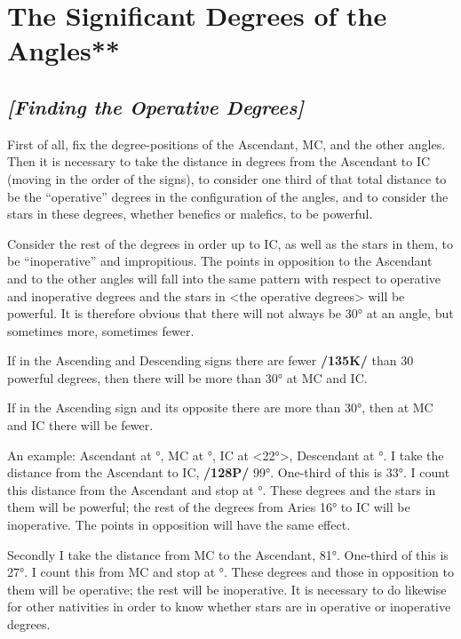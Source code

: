 \section{The Significant Degrees of the Angles**}
\subsection{\textit{[Finding the Operative Degrees]}}
First of all, fix the degree-positions of the Ascendant, MC, and the other angles. Then it is necessary to take the distance in degrees from the Ascendant to IC (moving in the order of the signs), to consider one third of that total distance to be the “operative” degrees in the configuration of the angles, and to consider the stars in these degrees, whether benefics or malefics, to be powerful. 

Consider the rest of the degrees in order up to IC, as well as the stars in them, to be “inoperative” and impropitious. The points in opposition to the Ascendant and to the other angles will fall into the same pattern with respect to operative
and inoperative degrees and the stars in <the operative degrees> will be powerful. It is therefore obvious that there will not always be 30° at an angle, but sometimes more, sometimes fewer. 

If in the Ascending and Descending signs there are fewer \textbf{/135K/} than 30 powerful degrees, then there will be more than 30° at MC and IC. 

If in the Ascending sign and its opposite there are more than 30°, then at MC and IC there will be fewer.

An example: Ascendant at \Pisces\xspace 13°, MC at \Sagittarius\xspace 22°, IC at \Gemini <22°>, Descendant at
\Virgo\xspace 13°. I take the distance from the Ascendant to IC, \textbf{/128P/} 99°. One-third of this is 33°. I count this
distance from the Ascendant and stop at \Aries\xspace 16°. These degrees and the stars in them will be powerful; the rest of the degrees from Aries 16° to IC will be inoperative. The points in opposition will have the same effect. 

Secondly I take the distance from MC to the Ascendant, 81°. One-third of this is 27°. I count this from MC and stop at \Capricorn\xspace 19°. These degrees and those in opposition to them will be operative; the rest will be inoperative. It is necessary to do likewise for other nativities in order to know whether stars are in operative or inoperative degrees.

